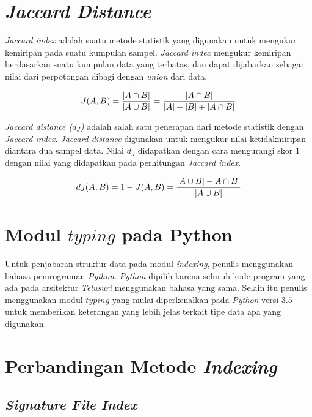 \section{\textit{Jaccard Distance}}

\textit{Jaccard index} adalah suatu metode statistik yang digunakan untuk
mengukur kemiripan pada suatu kumpulan sampel. \textit{Jaccard index} mengukur
kemiripan berdasarkan suatu kumpulan data yang terbatas, dan dapat dijabarkan
sebagai nilai dari perpotongan dibagi dengan \textit{union} dari data.

\begin{equation}
  J(A,B)={{|A\cap B|} \over {|A\cup B|}} = {{|A\cap B|} \over {|A| + |B| + |A\cap B|}}
\end{equation}

\textit{Jaccard distance ($d_{J}$)} adalah salah satu penerapan dari metode
statistik dengan \textit{Jaccard index}. \textit{Jaccard distance} digunakan
untuk mengukur nilai ketidakmiripan diantara dua sampel data. Nilai $d_{J}$
didapatkan dengan cara mengurangi skor $1$ dengan nilai yang didapatkan pada
perhitungan \textit{Jaccard index}.

\begin{equation}
  d_{J}(A,B)= 1 - J(A,B) = {{|A\cup B|} - {A\cap B|} \over {|A\cup B|}}
\end{equation}

\section{Modul $typing$ pada Python}

Untuk penjabaran struktur data pada modul \textit{indexing}, penulis menggunakan
bahasa pemrograman \textit{Python}. \textit{Python} dipilih karena seluruh kode
program yang ada pada arsitektur \textit{Telusuri} menggunakan bahasa yang sama.
Selain itu penulis menggunakan modul $typing$ yang mulai diperkenalkan pada
\textit{Python} versi $3.5$ untuk memberikan keterangan yang lebih jelas terkait
tipe data apa yang digunakan.

\section{Perbandingan Metode \emph{Indexing}}

\subsection{\emph{Signature File Index}}

